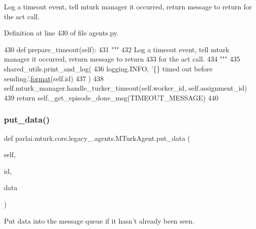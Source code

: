 \begin{DoxyVerb}Log a timeout event, tell mturk manager it occurred, return message to return
for the act call.
\end{DoxyVerb}
 

Definition at line 430 of file agents.\+py.


\begin{DoxyCode}
430     \textcolor{keyword}{def }prepare\_timeout(self):
431         \textcolor{stringliteral}{"""}
432 \textcolor{stringliteral}{        Log a timeout event, tell mturk manager it occurred, return message to return}
433 \textcolor{stringliteral}{        for the act call.}
434 \textcolor{stringliteral}{        """}
435         shared\_utils.print\_and\_log(
436             logging.INFO, \textcolor{stringliteral}{'\{\} timed out before sending.'}.\hyperlink{namespaceparlai_1_1chat__service_1_1services_1_1messenger_1_1shared__utils_a32e2e2022b824fbaf80c747160b52a76}{format}(self.id)
437         )
438         self.mturk\_manager.handle\_turker\_timeout(self.worker\_id, self.assignment\_id)
439         \textcolor{keywordflow}{return} self.\_get\_episode\_done\_msg(TIMEOUT\_MESSAGE)
440 
\end{DoxyCode}
\mbox{\label{classparlai_1_1mturk_1_1core_1_1legacy__2018_1_1agents_1_1MTurkAgent_abcc954a77ce4be0d6c51b65d51553c07}} 
\subsubsection{\texorpdfstring{put\+\_\+data()}{put\_data()}}
{\footnotesize\ttfamily def parlai.\+mturk.\+core.\+legacy\+\_.\+agents.\+M\+Turk\+Agent.\+put\+\_\+data (\begin{DoxyParamCaption}\item[{}]{self,  }\item[{}]{id,  }\item[{}]{data }\end{DoxyParamCaption})}

\begin{DoxyVerb}Put data into the message queue if it hasn't already been seen.
\end{DoxyVerb}
 

